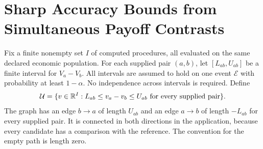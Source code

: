 \section{Sharp Accuracy Bounds from Simultaneous Payoff Contrasts}\label{app:r18closure}
Fix a finite nonempty set $I$ of computed procedures, all evaluated on the
same declared economic population. For each supplied pair $(a,b)$, let
$[L_{ab},U_{ab}]$ be a finite interval for $V_a-V_b$. All intervals are
assumed to hold on one event $\mathcal E$ with probability at least
$1-\alpha$. No independence across intervals is required. Define
\[
 \mathcal U=\{v\in\mathbb R^I:L_{ab}\leq v_a-v_b\leq U_{ab}
                    \text{ for every supplied pair}\}.
\]
The graph has an edge $b\to a$ of length $U_{ab}$ and an edge $a\to b$
of length $-L_{ab}$ for every supplied pair. It is connected in both
directions in the application, because every candidate has a comparison
with the reference. The convention for the empty path is length zero.

